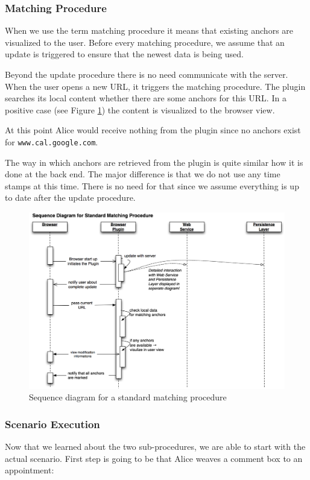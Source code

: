\subsubsection{Matching Procedure}
When we use the term matching procedure it means that existing anchors are visualized to the user. Before every matching procedure, we assume that an update is triggered to ensure that the newest data is being used. 

Beyond the update procedure there is no need communicate with the server. When the user opens a new URL, it triggers the matching procedure. The plugin searches its local content whether there are some anchors for this URL. In a positive case (see Figure \ref{sequence-matching-process}) the content is visualized to the browser view. 

At this point Alice would receive nothing from the plugin since no anchors exist for \verb+www.cal.google.com+. 

The way in which anchors are retrieved from the plugin is quite similar how it is done at the back end. The major difference is that we do not use any time stamps at this time. There is no need for that since we assume everything is up to date after the update procedure. 

\begin{figure}\centering
		\includegraphics[width=13cm]{images/sequence-matching-process.png}
		\caption{Sequence diagram for a standard matching procedure}
		\label{sequence-matching-process}
\end{figure} 

\subsubsection{Scenario Execution}
Now that we learned about the two sub-procedures, we are able to start with the actual scenario. First step is going to be that Alice weaves a comment box to an appointment: 

